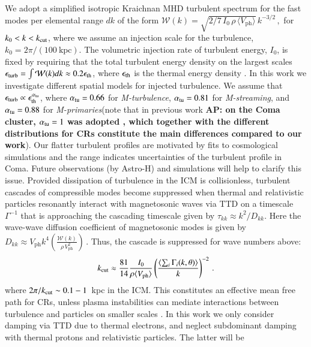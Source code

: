 \documentclass[useAMS,usenatbib]{mn2e}
\newcommand{\Mstream}{{\it M-streaming}\xspace}
\newcommand{\Mflatturb}{{\it M-turbulence}\xspace}
\newcommand{\Mprimary}{{\it M-primaries}\xspace}
\newcommand{\Vph}{V_\mathrm{ph}}
\def\AP#1{{\bf  AP: #1}}
\begin{document}
We adopt a simplified isotropic Kraichnan MHD turbulent spectrum for
the fast modes per elemental range $dk$ of the form $\mathcal{W}(k) =
\sqrt{2/7\,I_0\,\rho\,\langle \Vph \rangle}\,k^{-3/2}\,,$ for
$k_0<k<k_{\mathrm{cut}}$, where we assume an injection scale for the
turbulence, $k_0= 2\pi/(100~\mbox{kpc})$. The volumetric injection
rate of turbulent energy, $I_0$, is fixed by requiring that the total
turbulent energy density on the largest scales
$\epsilon_{\mathrm{turb}}=\int \mathcal{W}(k) dk \approx 0.2
\epsilon_{\mathrm{th}}$, where $\epsilon_{\mathrm{th}}$ is the thermal energy
density \citep{brunetti07,brunetti11}. In this work we investigate
different spatial models for injected turbulence. We assume that
$\epsilon_{\mathrm{turb}} \propto \epsilon_{\mathrm{th}}^{\alpha_{\mathrm{tu}}}$,
where $\alpha_{\mathrm{tu}}= 0.66$ for \Mflatturb, $\alpha_{\mathrm{tu}}= 0.81$
for \Mstream, and $\alpha_{\mathrm{tu}}= 0.88$ for \Mprimary (note that in
previous work \AP{on the Coma cluster, $\alpha_{\mathrm{tu}}= 1$ was
  adopted \citep{brunetti12}, which together with the different
  distributions for CRs constitute the main differences compared to
  our work}). Our flatter turbulent profiles are motivated by fits to
cosmological simulations
\citep{2009ApJ...705.1129L,2010ApJ...725.1452S,2012ApJ...758...74B}
and the range indicates uncertainties of the turbulent profile in
Coma. Future observations (by Astro-H) and simulations will help to
clarify this issue. Provided dissipation of turbulence in the ICM is
collisionless, turbulent cascades of compressible modes become
suppressed when thermal and relativistic particles resonantly interact
with magnetosonic waves via TTD on a timescale $\Gamma^{-1}$ that is
approaching the cascading timescale given by $\tau_{kk} \approx
k^2/D_{kk}$. Here the wave-wave diffusion coefficient of magnetosonic
modes is given by $D_{kk} \approx \Vph k^4
\left(\frac{\mathcal{W}(k)}{\rho\,\Vph^2}\right)\,.$ Thus, the cascade
is suppressed for wave numbers above:
\begin{equation}
\label{eq:kc}
  k_\rmn{cut} \approx \frac{81}{14} \frac{I_0}{\rho \langle \Vph \rangle}
  \left(\frac{\langle\sum_i \Gamma_i(k,\theta)\rangle}{k}\right)^{-2}\,.
\end{equation}
where $2\pi/k_{\mathrm{cut}}\sim 0.1-1$~kpc in the ICM. This constitutes an
effective mean free path for CRs, unless plasma instabilities can
mediate interactions between turbulence and particles on smaller
scales \citep{brunetti11}. In this work we only consider damping via
TTD due to thermal electrons, and neglect subdominant damping with
thermal protons and relativistic particles. The latter will be
\end{document}
